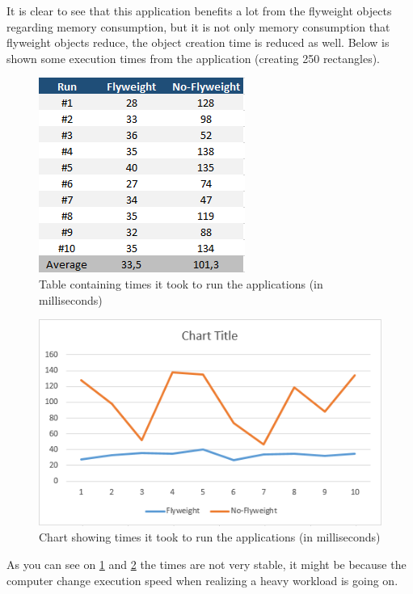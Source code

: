 It is clear to see that this application benefits a lot from the flyweight objects regarding memory consumption, but it is not only memory consumption that flyweight objects reduce, the object creation time is reduced as well. Below is shown some execution times from the application (creating 250 rectangles).
\begin{figure}[h]
\centering
\includegraphics{Content/TimeTable}
\caption{Table containing times it took to run the applications (in milliseconds)}
\label{fig:TimeTable}
\end{figure}
\begin{figure}[h]
	\centering
	\includegraphics{Content/TimeChart}
	\caption{Chart showing times it took to run the applications (in milliseconds)}
	\label{fig:TimeChart}
\end{figure}
As you can see on \ref{fig:TimeTable} and \ref{fig:TimeChart} the times are not very stable, it might be because the computer change execution speed when realizing a heavy workload is going on. 